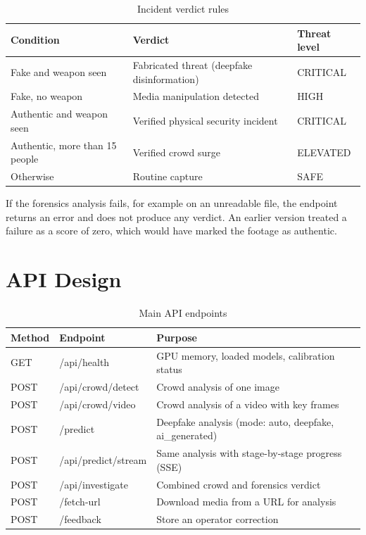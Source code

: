 \documentclass[12pt,a4paper,oneside]{report}
\begin{document}
\begin{table}[H]
\centering
\caption{Incident verdict rules}\label{tab:verdict}
\begin{tabularx}{\textwidth}{@{}lXl@{}}
\toprule
Condition & Verdict & Threat level \\
\midrule
Fake and weapon seen & Fabricated threat (deepfake disinformation) & CRITICAL \\
Fake, no weapon & Media manipulation detected & HIGH \\
Authentic and weapon seen & Verified physical security incident & CRITICAL \\
Authentic, more than 15 people & Verified crowd surge & ELEVATED \\
Otherwise & Routine capture & SAFE \\
\bottomrule
\end{tabularx}
\end{table}

If the forensics analysis fails, for example on an unreadable file, the endpoint returns an error and does not produce any verdict. An earlier version treated a failure as a score of zero, which would have marked the footage as authentic.

\section{API Design}
\begin{table}[H]
\centering
\caption{Main API endpoints}\label{tab:api}
\begin{tabularx}{\textwidth}{@{}llX@{}}
\toprule
Method & Endpoint & Purpose \\
\midrule
GET & /api/health & GPU memory, loaded models, calibration status \\
POST & /api/crowd/detect & Crowd analysis of one image \\
POST & /api/crowd/video & Crowd analysis of a video with key frames \\
POST & /predict & Deepfake analysis (mode: auto, deepfake, ai\_generated) \\
POST & /api/predict/stream & Same analysis with stage-by-stage progress (SSE) \\
POST & /api/investigate & Combined crowd and forensics verdict \\
POST & /fetch-url & Download media from a URL for analysis \\
POST & /feedback & Store an operator correction \\
\bottomrule
\end{tabularx}
\end{table}
\end{document}

